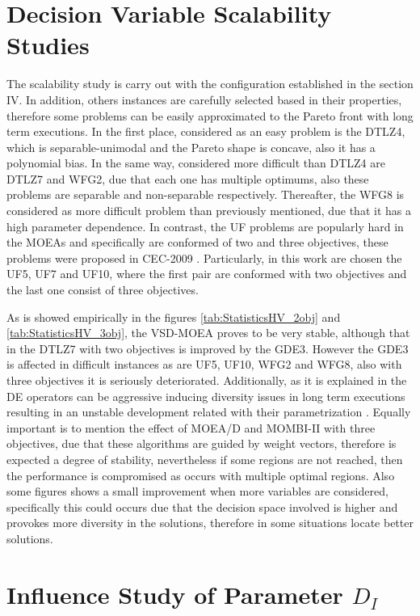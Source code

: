
\section{Decision Variable Scalability Studies}
\IEEEPARstart{}{} The scalability study is carry out with the configuration established in the section IV.
%
In addition, others instances are carefully selected based in their properties, therefore some problems can be easily approximated to the Pareto front with long term executions.
%
In the first place, considered as an easy problem is the DTLZ4, which is separable-unimodal and the Pareto shape is concave, also it has a polynomial bias.
%
In the same way, considered more difficult than DTLZ4 are DTLZ7 and WFG2, due that each one has multiple optimums, also these problems are separable and non-separable respectively. 
%
Thereafter, the WFG8 is considered as more difficult problem than previously mentioned, due that it has a high parameter dependence.
%
In contrast, the UF problems are popularly hard in the MOEAs and specifically are conformed of two and three objectives, these problems were proposed in CEC-2009 \cite{Joel:CEC2009}.
%
Particularly, in this work are chosen the UF5, UF7 and UF10, where the first pair are conformed with two objectives and the last one consist of three objectives.
%

As is showed empirically in the figures \ref{tab:StatisticsHV_2obj} and \ref{tab:StatisticsHV_3obj}, the VSD-MOEA proves to be very stable, although that in the DTLZ7 with two objectives is improved by the GDE3.
%
However the GDE3 is affected in difficult instances as are UF5, UF10, WFG2 and WFG8, also with three objectives it is seriously deteriorated.
%
Additionally, as it is explained in \cite{Joel:GDE3_CEC09} the DE operators can be aggressive inducing diversity issues in long term executions resulting in an unstable development 	related with their parametrization .
%
Equally important is to mention the effect of MOEA/D and MOMBI-II with three objectives, due that these algorithms are guided by weight vectors, therefore is expected a degree of stability, nevertheless if some regions are not reached, then the performance is compromised as occurs with multiple optimal regions.
%
Also some figures shows a small improvement when more variables are considered, specifically this could occurs due that the decision space involved is higher and provokes more diversity in the solutions, therefore in some situations locate better solutions.

\section{Influence Study of Parameter $D_I$}


